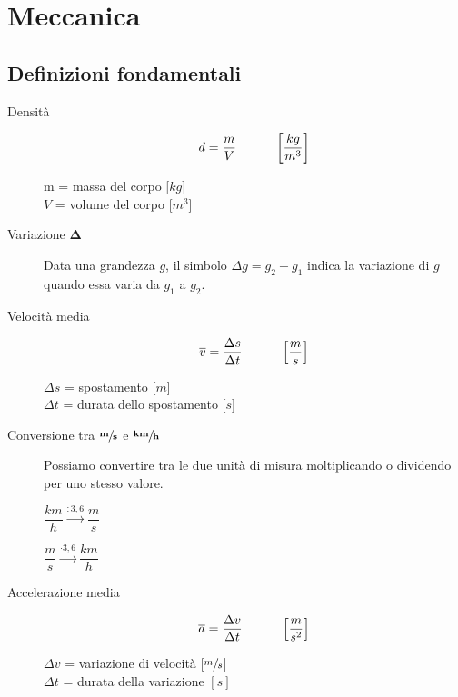 \documentclass[a4paper,11pt,italian]{article}
\begin{document}
\newpage
\section{Meccanica}

\subsection{Definizioni fondamentali}

\begin{description}
  \item[Densità] 
  \[ d = \frac{m}{V} \hspace*{3em} \left[ \frac{kg}{m^3} \right] \]
  \begin{multicols}{2}
  m = massa del corpo [$ kg $]\\
  $ V $ = volume del corpo [$ m^3 $]
  \end{multicols}
  
  \item[Variazione $ \mathbf{\Delta} $] 
  Data una grandezza $ g $, il simbolo $ \Delta g = g_2 - g_1 $ indica la variazione di $ g $ quando essa varia da $ g_1 $ a $ g_2 $.
  
  \item[Velocità media]
  \[ \overline{v} = \frac{\Delta s}{\Delta t} \hspace*{3em} \left[ \frac{m}{s} \right] \]
  \begin{multicols}{2}
  $ \Delta s $ = spostamento [$ m $]\\
  $ \Delta t $ = durata dello spostamento [$ s $]
  \end{multicols}
  
  \item[Conversione tra $ \sfrac{\mathbf{m}}{\mathbf{s}} $ e $ \sfrac{\mathbf{km}}{\mathbf{h}} $] 
  Possiamo convertire tra le due unità di misura moltiplicando o dividendo per uno stesso valore.
  \begin{multicols}{2}\begin{center}
  $ \dfrac{km}{h} \xrightarrow{: 3,6} \dfrac{m}{s} $
   
  $ \dfrac{m}{s} \xrightarrow{\cdot 3,6} \dfrac{km}{h} $
  \end{center}\end{multicols}
  
  \item[Accelerazione media] 
  \[ \overline{a} = \frac{\Delta v}{\Delta t} \hspace*{3em} \left[ \frac{m}{s^2} \right]  \]
  \begin{multicols}{2}
  $ \Delta v $ = variazione di velocità [$ \sfrac{m}{s}$]\\
  $ \Delta t $ = durata della variazione $ [s] $
  \end{multicols}


\end{description}
\end{document}
